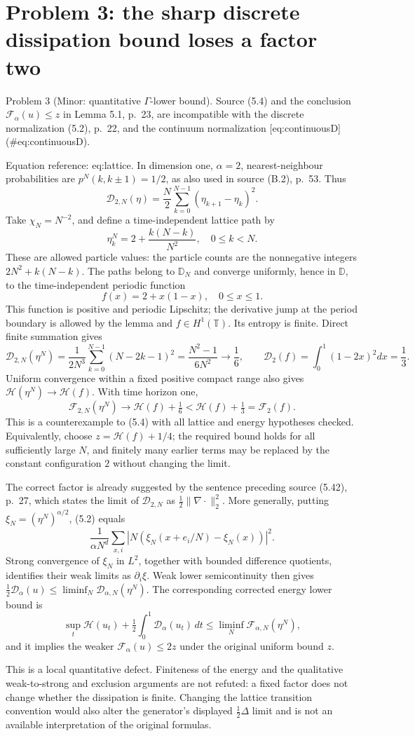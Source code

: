 \documentclass[10pt]{article}
\begin{document}
\section*{Problem 3: the sharp discrete dissipation bound loses a factor two}
Problem 3 (Minor: quantitative \(\Gamma\)-lower bound).  Source (5.4) and the conclusion \(\mathcal F_\alpha(u)\le z\) in Lemma 5.1, p. 23, are incompatible with the discrete normalization (5.2), p. 22, and the continuum normalization [eq:continuousD] (\#eq:continuousD).\par
Equation reference: eq:lattice. In dimension one, \(\alpha=2\), nearest-neighbour probabilities are \(p^N(k,k\pm1)=1/2\), as also used in source (B.2), p. 53. Thus \[\mathcal D_{2,N}(\eta)=\frac N2\sum_{k=0}^{N-1}
 (\eta_{k+1}-\eta_k)^2.\] Take \(\chi_N=N^{-2}\), and define a time-independent lattice path by \[\eta_k^N=2+\frac{k(N-k)}{N^2},\quad 0\le k<N.\] These are allowed particle values: the particle counts are the nonnegative integers \(2N^2+k(N-k)\). The paths belong to \(\mathbb D_N\) and converge uniformly, hence in \(\mathbb D\), to the time-independent periodic function \[f(x)=2+x(1-x),\quad 0\le x\le1.\] This function is positive and periodic Lipschitz; the derivative jump at the period boundary is allowed by the lemma and \(f\in H^1(\mathbb T)\). Its entropy is finite. Direct finite summation gives \[
\mathcal D_{2,N}(\eta^N)
 =\frac1{2N^3}\sum_{k=0}^{N-1}(N-2k-1)^2
 =\frac{N^2-1}{6N^2}\longrightarrow\frac16,
\qquad
\mathcal D_2(f)=\int_0^1(1-2x)^2dx=\frac13.\] Uniform convergence within a fixed positive compact range also gives \(\mathcal H(\eta^N)\to\mathcal H(f)\). With time horizon one, \[\mathcal F_{2,N}(\eta^N)\to\mathcal H(f)+\tfrac16
 <\mathcal H(f)+\tfrac13=\mathcal F_2(f).\] This is a counterexample to (5.4) with all lattice and energy hypotheses checked. Equivalently, choose \(z=\mathcal H(f)+1/4\); the required bound holds for all sufficiently large \(N\), and finitely many earlier terms may be replaced by the constant configuration \(2\) without changing the limit.\par
The correct factor is already suggested by the sentence preceding source (5.42), p. 27, which states the limit of \(\mathcal D_{2,N}\) as \(\tfrac12\|\nabla\cdot\|_2^2\). More generally, putting \(\xi_N=(\eta^N)^{\alpha/2}\), (5.2) equals \[\frac1{\alpha N^d}\sum_{x,i}
 |N(\xi_N(x+e_i/N)-\xi_N(x))|^2.\] Strong convergence of \(\xi_N\) in \(L^2\), together with bounded difference quotients, identifies their weak limits as \(\partial_i\xi\). Weak lower semicontinuity then gives \(\tfrac12\mathcal D_\alpha(u)\le\liminf_N\mathcal D_{\alpha,N}(\eta^N)\). The corresponding corrected energy lower bound is \[\sup_t\mathcal H(u_t)+\tfrac12\int_0^1\mathcal D_\alpha(u_t)\,dt
 \le\liminf_N\mathcal F_{\alpha,N}(\eta^N),\] and it implies the weaker \(\mathcal F_\alpha(u)\le2z\) under the original uniform bound \(z\).\par
This is a local quantitative defect. Finiteness of the energy and the qualitative weak-to-strong and exclusion arguments are not refuted: a fixed factor does not change whether the dissipation is finite. Changing the lattice transition convention would also alter the generator’s displayed \(\tfrac12\Delta\) limit and is not an available interpretation of the original formulas.\par
\end{document}
